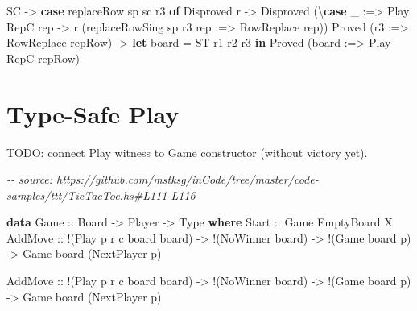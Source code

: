 \documentclass[]{article}
\newenvironment{Shaded}{}{}
\newcommand{\CommentTok}[1]{\textcolor[rgb]{0.38,0.63,0.69}{\textit{#1}}}
\newcommand{\DataTypeTok}[1]{\textcolor[rgb]{0.56,0.13,0.00}{#1}}
\newcommand{\KeywordTok}[1]{\textcolor[rgb]{0.00,0.44,0.13}{\textbf{#1}}}
\newcommand{\NormalTok}[1]{#1}
\newcommand{\OperatorTok}[1]{\textcolor[rgb]{0.40,0.40,0.40}{#1}}
\newcommand{\OtherTok}[1]{\textcolor[rgb]{0.00,0.44,0.13}{#1}}
\begin{document}
\begin{Shaded}
\begin{Highlighting}[]
        \DataTypeTok{SC} \OtherTok{{-}\textgreater{}}
            \KeywordTok{case}\NormalTok{ replaceRow sp sc r3 }\KeywordTok{of}
                \DataTypeTok{Disproved}\NormalTok{ r }\OtherTok{{-}\textgreater{}} \DataTypeTok{Disproved}\NormalTok{ (\textbackslash{}}\KeywordTok{case}
\NormalTok{                    \_ }\OperatorTok{:=\textgreater{}} \DataTypeTok{Play} \DataTypeTok{RepC}\NormalTok{ rep }\OtherTok{{-}\textgreater{}}
\NormalTok{                        r (replaceRowSing sp r3 rep }\OperatorTok{:=\textgreater{}} \DataTypeTok{RowReplace}\NormalTok{ rep))}
                \DataTypeTok{Proved}\NormalTok{ (r3\textquotesingle{} }\OperatorTok{:=\textgreater{}} \DataTypeTok{RowReplace}\NormalTok{ repRow) }\OtherTok{{-}\textgreater{}}
                    \KeywordTok{let}\NormalTok{ board\textquotesingle{} }\OtherTok{=} \DataTypeTok{ST}\NormalTok{ r1 r2 r3\textquotesingle{}}
                    \KeywordTok{in} \DataTypeTok{Proved}\NormalTok{ (board\textquotesingle{} }\OperatorTok{:=\textgreater{}} \DataTypeTok{Play} \DataTypeTok{RepC}\NormalTok{ repRow)}
\end{Highlighting}
\end{Shaded}

\section{Type-Safe Play}\label{type-safe-play}

TODO: connect Play witness to Game constructor (without victory yet).

\begin{Shaded}
\begin{Highlighting}[]
\CommentTok{{-}{-} source: https://github.com/mstksg/inCode/tree/master/code{-}samples/ttt/TicTacToe.hs\#L111{-}L116}

\KeywordTok{data} \DataTypeTok{Game}\OtherTok{ ::} \DataTypeTok{Board} \OtherTok{{-}\textgreater{}} \DataTypeTok{Player} \OtherTok{{-}\textgreater{}} \DataTypeTok{Type} \KeywordTok{where}
    \DataTypeTok{Start}\OtherTok{ ::} \DataTypeTok{Game} \DataTypeTok{EmptyBoard} \DataTypeTok{X}
    \DataTypeTok{AddMove}\OtherTok{ ::} \OperatorTok{!}\NormalTok{(}\DataTypeTok{Play}\NormalTok{ p r c board board\textquotesingle{})}
            \OtherTok{{-}\textgreater{}} \OperatorTok{!}\NormalTok{(}\DataTypeTok{NoWinner}\NormalTok{ board)}
            \OtherTok{{-}\textgreater{}} \OperatorTok{!}\NormalTok{(}\DataTypeTok{Game}\NormalTok{ board p)}
            \OtherTok{{-}\textgreater{}} \DataTypeTok{Game}\NormalTok{ board\textquotesingle{} (}\DataTypeTok{NextPlayer}\NormalTok{ p)}

    \DataTypeTok{AddMove}\OtherTok{ ::} \OperatorTok{!}\NormalTok{(}\DataTypeTok{Play}\NormalTok{ p r c board board\textquotesingle{})}
            \OtherTok{{-}\textgreater{}} \OperatorTok{!}\NormalTok{(}\DataTypeTok{NoWinner}\NormalTok{ board)}
            \OtherTok{{-}\textgreater{}} \OperatorTok{!}\NormalTok{(}\DataTypeTok{Game}\NormalTok{ board p)}
            \OtherTok{{-}\textgreater{}} \DataTypeTok{Game}\NormalTok{ board\textquotesingle{} (}\DataTypeTok{NextPlayer}\NormalTok{ p)}
\end{Highlighting}
\end{Shaded}
\end{document}

